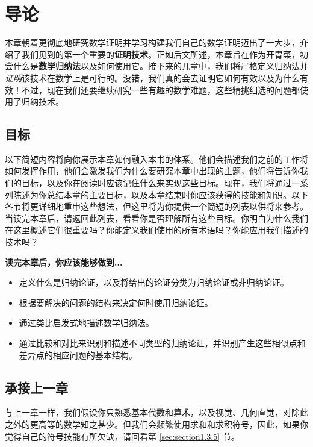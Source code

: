 \section{导论}

本章朝着更彻底地研究数学证明并学习构建我们自己的数学证明迈出了一大步，介绍了我们见到的第一个重要的\textbf{证明技术}。正如后文所述，本章旨在作为开胃菜，初尝什么是\textbf{数学归纳法}以及如何使用它。接下来的几章中，我们将严格定义归纳法并\textit{证明}该技术在数学上是可行的。没错，我们真的会去证明它如何有效以及为什么有效！不过，现在我们还要继续研究一些有趣的数学难题，这些精挑细选的问题都使用了归纳技术。

\subsection{目标}

以下简短内容将向你展示本章如何融入本书的体系。他们会描述我们之前的工作将如何发挥作用，他们会激发我们为什么要研究本章中出现的主题，他们将告诉你我们的目标，以及你在阅读时应该记住什么来实现这些目标。现在，我们将通过一系列陈述为你总结本章的主要目标，以及本章结束时你应该获得的技能和知识。以下各节将更详细地重申这些想法，但这里将为你提供一个简短的列表以供将来参考。当读完本章后，请返回此列表，看看你是否理解所有这些目标。你明白为什么我们在这里概述它们很重要吗？你能定义我们使用的所有术语吗？你能应用我们描述的技术吗？

\textbf{读完本章后，你应该能够做到...}

\begin{itemize}
    \item 定义什么是归纳论证，以及将给出的论证分类为归纳论证或非归纳论证。
    \item 根据要解决的问题的结构来决定何时使用归纳论证。
    \item 通过类比启发式地描述数学归纳法。
    \item 通过比较和对比来识别和描述不同类型的归纳论证，并识别产生这些相似点和差异点的相应问题的基本结构。
\end{itemize}

\subsection{承接上一章}

与上一章一样，我们假设你只熟悉基本代数和算术，以及视觉、几何直觉，对除此之外的更高等的数学知之甚少。但我们会频繁使用求和和求积符号，因此，如果你觉得自己的符号技能有所欠缺，请回看第 \ref{sec:section1.3.5} 节。

